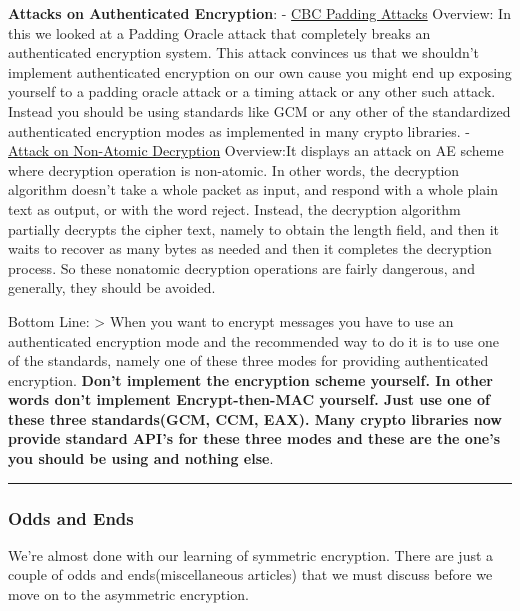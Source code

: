 \documentclass[11pt]{article}
\begin{document}
\textbf{Attacks on Authenticated Encryption}: -
\href{https://www.coursera.org/learn/crypto/lecture/8s23o/cbc-padding-attacks}{CBC
Padding Attacks} Overview: In this we looked at a Padding Oracle attack
that completely breaks an authenticated encryption system. This attack
convinces us that we shouldn't implement authenticated encryption on our
own cause you might end up exposing yourself to a padding oracle attack
or a timing attack or any other such attack. Instead you should be using
standards like GCM or any other of the standardized authenticated
encryption modes as implemented in many crypto libraries. -
\href{https://www.coursera.org/learn/crypto/lecture/mtJS8/attacking-non-atomic-decryption}{Attack
on Non-Atomic Decryption} Overview:It displays an attack on AE scheme
where decryption operation is non-atomic. In other words, the decryption
algorithm doesn't take a whole packet as input, and respond with a whole
plain text as output, or with the word reject. Instead, the decryption
algorithm partially decrypts the cipher text, namely to obtain the
length field, and then it waits to recover as many bytes as needed and
then it completes the decryption process. So these nonatomic decryption
operations are fairly dangerous, and generally, they should be avoided.

Bottom Line: \textgreater{} When you want to encrypt messages you have
to use an authenticated encryption mode and the recommended way to do it
is to use one of the standards, namely one of these three modes for
providing authenticated encryption. \textbf{Don't implement the
encryption scheme yourself. In other words don't implement
Encrypt-then-MAC yourself. Just use one of these three standards(GCM,
CCM, EAX). Many crypto libraries now provide standard API's for these
three modes and these are the one's you should be using and nothing
else}.

\begin{center}\rule{0.5\linewidth}{\linethickness}\end{center}

    \hypertarget{odds-and-ends}{%
\subsubsection{Odds and Ends}\label{odds-and-ends}}

We're almost done with our learning of symmetric encryption. There are
just a couple of odds and ends(miscellaneous articles) that we must
discuss before we move on to the asymmetric encryption.
\end{document}
